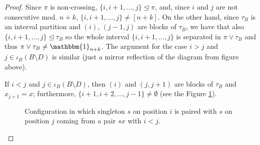 \documentclass{amsart}
\begin{document}
\begin{proof}
    
    
    Since $ \pi $ is non-crossing, 
    $ \{i, i+1, \dots, j\} \trianglelefteq \pi$, and, since $i $ and $j $ are not consecutive mod. $n+k$, 
    $\{i, i+1, \dots, j\} \neq [n+k]$.  On the other hand, since $ \tau_B $ is an interval partition and $(i)$, $(j-1, j)$ are blocks of $ \tau_B $, we have that also
    $ \{i, i+1, \dots, j\} \trianglelefteq \tau_B$
    so the whole interval $ \{i, i+1, \dots, j\}$ is separated in $\pi\vee\tau_B$ and thus   $ \pi\vee \tau_B \neq \mathbbm{1}_{n+k}$. 
    The argument for the case $ i > j $ and 
    $ j \in \iota_B ( B \setminus D)$ is similar (just a mirror reflection of the diagram from figure  above).
    
    If $ i < j $ and $ j \in \iota_B (B \setminus D)$, then $(i)$ and $(j, j+1)$ are blocks of $ \tau_B $ and $ x_{j+1} = x $; furthermore, 
    $ \{ i+1, i+2, \dots, j-1\} \neq \emptyset$ (see the Figure \ref{fig:3}).
    \begin{center}
    \begin{figure}[H]
    \caption{Configuration in which singleton $s$ on position $i$ is paired with $s$ on position $j$ coming from a pair $sx$ with $i<j$.}
    \label{fig:3}
    \end{figure}
\end{center}
    

\end{proof}
\end{document}
